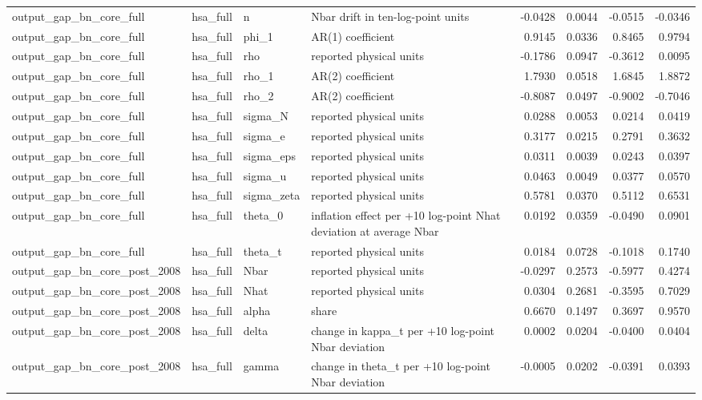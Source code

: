 \begin{tabular}{llllrrrr}
output\_gap\_bn\_core\_full & hsa\_full & n & Nbar drift in ten-log-point units & -0.0428 & 0.0044 & -0.0515 & -0.0346 \\
output\_gap\_bn\_core\_full & hsa\_full & phi\_1 & AR(1) coefficient & 0.9145 & 0.0336 & 0.8465 & 0.9794 \\
output\_gap\_bn\_core\_full & hsa\_full & rho & reported physical units & -0.1786 & 0.0947 & -0.3612 & 0.0095 \\
output\_gap\_bn\_core\_full & hsa\_full & rho\_1 & AR(2) coefficient & 1.7930 & 0.0518 & 1.6845 & 1.8872 \\
output\_gap\_bn\_core\_full & hsa\_full & rho\_2 & AR(2) coefficient & -0.8087 & 0.0497 & -0.9002 & -0.7046 \\
output\_gap\_bn\_core\_full & hsa\_full & sigma\_N & reported physical units & 0.0288 & 0.0053 & 0.0214 & 0.0419 \\
output\_gap\_bn\_core\_full & hsa\_full & sigma\_e & reported physical units & 0.3177 & 0.0215 & 0.2791 & 0.3632 \\
output\_gap\_bn\_core\_full & hsa\_full & sigma\_eps & reported physical units & 0.0311 & 0.0039 & 0.0243 & 0.0397 \\
output\_gap\_bn\_core\_full & hsa\_full & sigma\_u & reported physical units & 0.0463 & 0.0049 & 0.0377 & 0.0570 \\
output\_gap\_bn\_core\_full & hsa\_full & sigma\_zeta & reported physical units & 0.5781 & 0.0370 & 0.5112 & 0.6531 \\
output\_gap\_bn\_core\_full & hsa\_full & theta\_0 & inflation effect per +10 log-point Nhat deviation at average Nbar & 0.0192 & 0.0359 & -0.0490 & 0.0901 \\
output\_gap\_bn\_core\_full & hsa\_full & theta\_t & reported physical units & 0.0184 & 0.0728 & -0.1018 & 0.1740 \\
output\_gap\_bn\_core\_post\_2008 & hsa\_full & Nbar & reported physical units & -0.0297 & 0.2573 & -0.5977 & 0.4274 \\
output\_gap\_bn\_core\_post\_2008 & hsa\_full & Nhat & reported physical units & 0.0304 & 0.2681 & -0.3595 & 0.7029 \\
output\_gap\_bn\_core\_post\_2008 & hsa\_full & alpha & share & 0.6670 & 0.1497 & 0.3697 & 0.9570 \\
output\_gap\_bn\_core\_post\_2008 & hsa\_full & delta & change in kappa\_t per +10 log-point Nbar deviation & 0.0002 & 0.0204 & -0.0400 & 0.0404 \\
output\_gap\_bn\_core\_post\_2008 & hsa\_full & gamma & change in theta\_t per +10 log-point Nbar deviation & -0.0005 & 0.0202 & -0.0391 & 0.0393 \\

\end{tabular}
